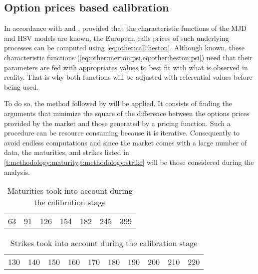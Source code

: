 \documentclass[12pt]{report}
\begin{document}
\subsection{Option prices based calibration}
\label{sub:methodology:calibration:option}

In accordance with \citet{heston1993} and \citet{criso2015}, provided that the characteristic functions of the MJD and HSV models are known, the European calls prices of such underlying processes can be computed using \cref{eq:other:call:heston}.
Although known, these characteristic functions (\cref{eq:other:merton:psi,eq:other:heston:psi}) need that their parameters are fed with appropriates values to best fit with what is observed in reality.
That is why both functions will be adjusted with referential values before being used.

To do so, the method followed by \citet{criso2015} will be applied.
It consists of finding the arguments that minimize the square of the difference between the options prices provided by the market and those generated by a pricing function.
Such a procedure can be resource consuming because it is iterative. 
Consequently to avoid endless computations and since the market comes with a large number of data, the maturities, and strikes listed in \cref{t:methodology:maturity,t:methodology:strike} will be those considered during the analysis.

\begin{table}[ht]
\centering
\begin{tabular}{lllllll}
  63 & 91 & 126 & 154 & 182 & 245 & 399 \\
\end{tabular}
\caption{Maturities took into account during the calibration stage} 
\label{t:methodology:maturity}
\end{table}

\begin{table}[ht]
\centering
\begin{tabular}{llllllllll}
  130 & 140 & 150 & 160 & 170 & 180 & 190 & 200 & 210 & 220 \\  
\end{tabular}
\caption{Strikes took into account during the calibration stage} 
\label{t:methodology:strike}
\end{table}
\end{document}
